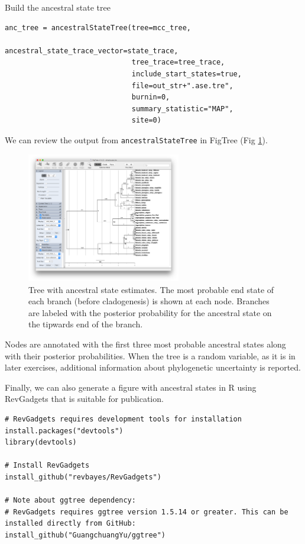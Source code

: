 Build the ancestral state tree

\begin{snugshade}
\begin{lstlisting}
anc_tree = ancestralStateTree(tree=mcc_tree,
                              ancestral_state_trace_vector=state_trace,
                              tree_trace=tree_trace,
                              include_start_states=true,
                              file=out_str+".ase.tre",
                              burnin=0,
                              summary_statistic="MAP",
                              site=0)
\end{lstlisting}
\end{snugshade}

We can review the output from {\tt ancestralStateTree} in FigTree (Fig \ref{fig:simple_FigTree_ase}).

\begin{figure}[!ht]
\centering
\includegraphics[width=0.6\textwidth]{figures/fig_simple_FigTree_ase.png}
\caption{Tree with ancestral state estimates. The most probable end state of each branch (before cladogenesis) is shown at each node. Branches are labeled with the posterior probability for the ancestral state on the tipwards end of the branch.}
\label{fig:simple_FigTree_ase}
\end{figure}

Nodes are annotated with the first three most probable ancestral states along with their posterior probabilities.
When the tree is a random variable, as it is in later exercises, additional information about phylogenetic uncertainty is reported.

Finally, we can also generate a figure with ancestral states in R using RevGadgets that is suitable for publication.

\begin{snugshade}
\begin{lstlisting}
# RevGadgets requires development tools for installation
install.packages("devtools")
library(devtools)

# Install RevGadgets
install_github("revbayes/RevGadgets")

# Note about ggtree dependency:
# RevGadgets requires ggtree version 1.5.14 or greater. This can be installed directly from GitHub:
install_github("GuangchuangYu/ggtree")
\end{lstlisting}
\end{snugshade}

